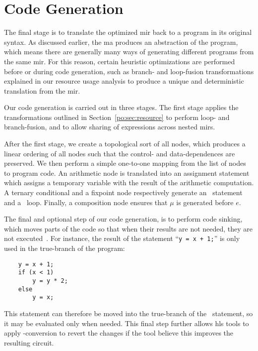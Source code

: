 \section{Code Generation}
\label{po:sec:code_generation}

The final stage is to translate the optimized \gls{mir} back to a program
in its original syntax.  As discussed earlier, the \gls{ma} produces an
abstraction of the program, which means there are generally many ways of
generating different programs from the same \gls{mir}\@.  For this reason,
certain heuristic optimizations are performed before or during code generation,
such as branch- and loop-fusion transformations explained in our resource
usage analysis to produce a unique and deterministic translation from the
\gls{mir}\@.

Our code generation is carried out in three stages.  The first stage applies
the transformations outlined in Section~\ref{po:sec:resource} to perform
loop- and branch-fusion, and to allow sharing of expressions across nested
\glspl{mir}.

After the first stage, we create a topological sort of all nodes, which
produces a linear ordering of all nodes such that the control- and
data-dependences are preserved.  We then perform a simple one-to-one mapping
from the list of nodes to program code.  An arithmetic node is translated into
an assignment statement which assigns a temporary variable with the result
of the arithmetic computation.  A ternary conditional and a fixpoint node
respectively generate an \iflit~statement and a \whilelit~loop.  Finally,
a composition node  ensures that $\mu$ is
generated before $e$.

The final and optional step of our code generation, is to perform code sinking,
which moves parts of the code so that when their results are not needed, they
are not executed~\cite{llvm}.  For instance, the result of the statement
``\lstinline[basicstyle=\tt]{y = x + 1;}'' is only used in the true-branch of
the program:
\begin{lstlisting}
    y = x + 1;
    if (x < 1)
        y = y * 2;
    else
        y = x;
\end{lstlisting}
This statement can therefore be moved into the true-branch of the
\iflit~statement, so it may be evaluated only when needed.  This final step
further allows \gls{hls} tools to apply \iflit-conversion to revert the changes
if the tool believe this improves the resulting circuit.
